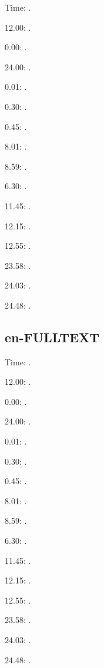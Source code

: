 \documentclass{article}
\begin{document}
Time: \DTMcurrenttime.

12.00: .

0.00: .

24.00: .

0.01: .

0.30: .

0.45: .

8.01: .

8.59: .

6.30: .

11.45: .

12.15: .

12.55: .

23.58: .

24.03: .

24.48: .

\subsection{en-FULLTEXT}

Time: \DTMcurrenttime.

12.00: .

0.00: .

24.00: .

0.01: .

0.30: .

0.45: .

8.01: .

8.59: .

6.30: .

11.45: .

12.15: .

12.55: .

23.58: .

24.03: .

24.48: .
\end{document}
